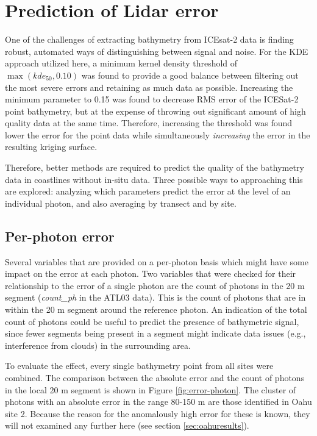 \section{Prediction of Lidar error}

One of the challenges of extracting bathymetry from ICEsat-2 data is finding robust, automated ways of distinguishing between signal and noise. For the KDE approach utilized here, a minimum kernel density threshold of $\max({kde_{50},0.10})$ was found to provide a good balance between filtering out the most severe errors and retaining as much data as possible. Increasing the minimum parameter to 0.15 was found to decrease RMS error of the ICESat-2 point bathymetry, but at the expense of throwing out significant amount of high quality data at the same time. Therefore, increasing the threshold was found lower the error for the point data while simultaneously \emph{increasing} the error in the resulting kriging surface.

Therefore, better methods are required to predict the quality of the bathymetry data in coastlines without in-situ data. Three possible ways to approaching this are explored: analyzing which parameters predict the error at the level of an individual photon, and also averaging by transect and by site.

\subsection{Per-photon error}
Several variables that are provided on a per-photon basis which might have some impact on the error at each photon. Two variables that were checked for their relationship to the error of a single photon are the count of photons in the 20 m segment (\emph{count\_ph} in the ATL03 data). This is the count of photons that are in within the 20 m segment around the reference photon. An indication of the total count of photons could be useful to predict the presence of bathymetric signal, since fewer segments being present in a segment might indicate data issues (e.g., interference from clouds) in the surrounding area.

To evaluate the effect, every single bathymetry point from all sites were combined. The comparison between the absolute error and the count of photons in the local 20 m segment is shown in Figure \ref{fig:error-photon}. The cluster of photons with an absolute error in the range 80-150 m are those identified in Oahu site 2. Because the reason for the anomalously high error for these is known, they will not examined any further here (see section \ref{sec:oahuresults}).

